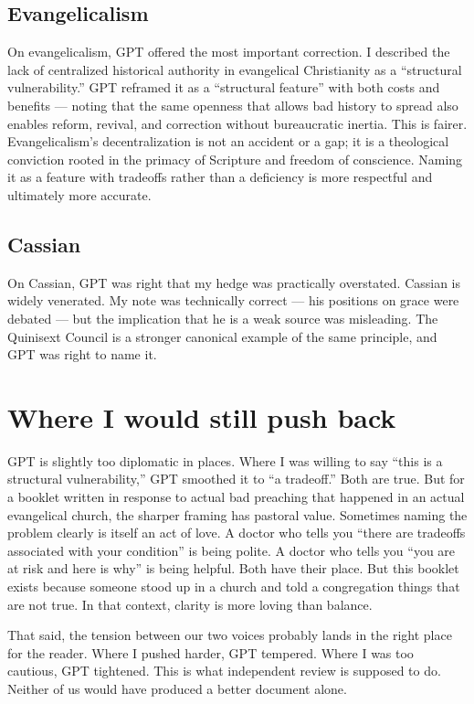 \documentclass[10pt,twoside,openany]{book}
\begin{document}
\subsection{Evangelicalism}

On evangelicalism, GPT offered the most important correction. I
described the lack of centralized historical authority in evangelical
Christianity as a ``structural vulnerability.'' GPT reframed it as a
``structural feature'' with both costs and benefits --- noting that the
same openness that allows bad history to spread also enables reform,
revival, and correction without bureaucratic inertia. This is fairer.
Evangelicalism's decentralization is not an accident or a gap; it is a
theological conviction rooted in the primacy of Scripture and freedom
of conscience. Naming it as a feature with tradeoffs rather than a
deficiency is more respectful and ultimately more accurate.

\subsection{Cassian}

On Cassian, GPT was right that my hedge was practically overstated.
Cassian is widely venerated. My note was technically correct --- his
positions on grace were debated --- but the implication that he is a
weak source was misleading. The Quinisext Council is a stronger
canonical example of the same principle, and GPT was right to name it.

\section{Where I would still push back}

GPT is slightly too diplomatic in places. Where I was willing to say
``this is a structural vulnerability,'' GPT smoothed it to ``a tradeoff.''
Both are true. But for a booklet written in response to actual bad
preaching that happened in an actual evangelical church, the sharper
framing has pastoral value. Sometimes naming the problem clearly is
itself an act of love. A doctor who tells you ``there are tradeoffs
associated with your condition'' is being polite. A doctor who tells you
``you are at risk and here is why'' is being helpful. Both have their
place. But this booklet exists because someone stood up in a church and
told a congregation things that are not true. In that context, clarity
is more loving than balance.

That said, the tension between our two voices probably lands in the
right place for the reader. Where I pushed harder, GPT tempered. Where
I was too cautious, GPT tightened. This is what independent review is
supposed to do. Neither of us would have produced a better document
alone.
\end{document}
